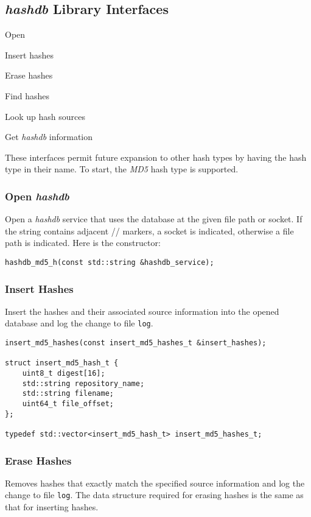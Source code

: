 \documentclass[12pt,twoside]{article}
\newcommand{\hdb}{\emph{hashdb}\xspace}
\begin{document}
\subsection{\hdb Library Interfaces}
\begin{compactitem}
\item Open
\item Insert hashes
\item Erase hashes
\item Find hashes
\item Look up hash sources
\item Get \hdb information
\end{compactitem}

These interfaces permit future expansion to other hash types
by having the hash type in their name.
To start, the \emph{MD5} hash type is supported.

\subsubsection{Open \hdb}
Open a \hdb service that uses the database at the given file path or socket.
If the string contains adjacent // markers, a socket is indicated,
otherwise a file path is indicated.
Here is the constructor:
\begin{small}
\begin{verbatim}
hashdb_md5_h(const std::string &hashdb_service);
\end{verbatim}
\end{small}

\subsubsection{Insert Hashes}
Insert the hashes and their associated source information
into the opened database and log the change to file \texttt{log}.
\begin{small}
\begin{verbatim}
insert_md5_hashes(const insert_md5_hashes_t &insert_hashes);

struct insert_md5_hash_t {
    uint8_t digest[16];
    std::string repository_name;
    std::string filename;
    uint64_t file_offset;
};

typedef std::vector<insert_md5_hash_t> insert_md5_hashes_t;
\end{verbatim}
\end{small}

\subsubsection{Erase Hashes}
Removes hashes that exactly match the specified source information
and log the change to file \texttt{log}.
The data structure required for erasing hashes
is the same as that for inserting hashes.
\end{document}
